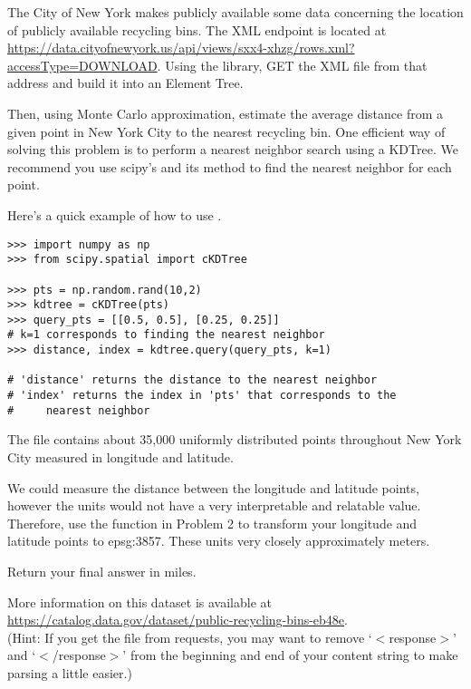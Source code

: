 \begin{problem}
The City of New York makes publicly available some data concerning the location of publicly available recycling bins.
The XML endpoint is located at \url{https://data.cityofnewyork.us/api/views/sxx4-xhzg/rows.xml?accessType=DOWNLOAD}.
Using the  library, GET the XML file from that address and build it into an Element Tree.

Then, using Monte Carlo approximation, estimate the average distance from a given point in New York City to the nearest recycling bin.
One efficient way of solving this problem is to perform a nearest neighbor search using a KDTree. We recommend you use scipy's  and its  method to find the nearest neighbor for each point.

Here's a quick example of how to use .

\begin{lstlisting}
>>> import numpy as np
>>> from scipy.spatial import cKDTree

>>> pts = np.random.rand(10,2)
>>> kdtree = cKDTree(pts)
>>> query_pts = [[0.5, 0.5], [0.25, 0.25]]
# k=1 corresponds to finding the nearest neighbor
>>> distance, index = kdtree.query(query_pts, k=1)

# 'distance' returns the distance to the nearest neighbor
# 'index' returns the index in 'pts' that corresponds to the
#     nearest neighbor
\end{lstlisting}

The  file contains about 35,000 uniformly distributed points throughout New York City measured in longitude and latitude.

We could measure the distance between the longitude and latitude points, however the units would not have a very interpretable and relatable value.
Therefore, use the  function in Problem 2 to transform your longitude and latitude points to epsg:3857. These units very closely approximately meters.

Return your final answer in miles.

More information on this dataset is available at \url{https://catalog.data.gov/dataset/public-recycling-bins-eb48e}.
\\ (Hint: If you get the file from requests, you may want to remove `$<$response$>$' and `$<$/response$>$' from the beginning and end of your content string to make parsing a little easier.)
\end{problem}

